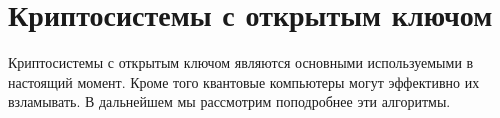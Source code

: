 \chapter{Криптосистемы с открытым ключом}
Криптосистемы с открытым ключом являются основными используемыми в
настоящий момент. Кроме того квантовые компьютеры могут эффективно их
взламывать. В дальнейшем мы рассмотрим поподробнее эти алгоритмы.




